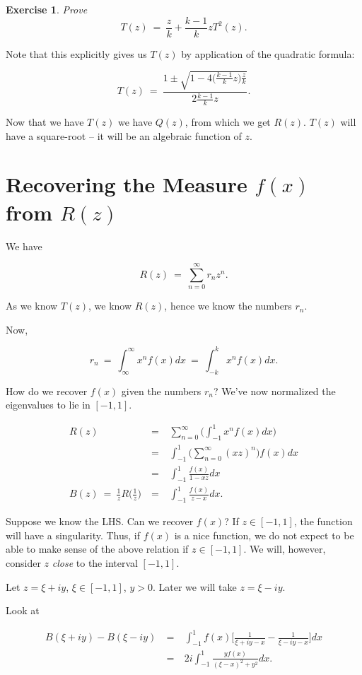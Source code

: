 \documentclass[12pt,letterpaper]{report}
\newcommand\be{\begin{equation}}
\newcommand\ee{\end{equation}}
\newcommand\bea{\begin{eqnarray}}
\newcommand\eea{\end{eqnarray}}
\newtheorem{exe}[thm]{Exercise}
\begin{document}
\begin{exe} Prove
\be T(z) \ = \ \frac{z}{k} + \frac{k-1}{k}z T^2(z). \ee
\end{exe}

Note that this explicitly gives us $T(z)$ by application of the
quadratic formula:

\be T(z) \ = \ \frac{1 \pm \sqrt{1 -  4 \Big( \frac{k-1}{k}z
\Big) \frac{z}{k} } }{2\frac{k-1}{k}z}. \ee

Now that we have $T(z)$ we have $Q(z)$, from which we get $R(z)$.
$T(z)$ will have a square-root -- it will be an algebraic function
of $z$.


\section{Recovering the Measure $f(x)$ from $R(z)$}

We have

\be R(z) \ = \ \sum_{n=0}^\infty r_n z^n. \ee

As we know $T(z)$, we know $R(z)$, hence we know the numbers
$r_n$.

Now,

\be r_n \ = \ \int_{\infty}^\infty x^n f(x)dx \ = \ \int_{-k}^k
x^n f(x)dx. \ee

How do we recover $f(x)$ given the numbers $r_n$? We've now
normalized the eigenvalues to lie in $[-1,1]$.

\bea R(z) & \ = \ & \sum_{n=0}^\infty \Bigg( \int_{-1}^1 x^n
f(x)dx \Bigg) \nonumber\\ & \ = \ & \int_{-1}^1 \Bigg(
\sum_{n=0}^\infty (xz)^n \Bigg) f(x) dx \nonumber\\ & \ = \ &
\int_{-1}^1 \frac{ f(x) }{1 - xz } dx \nonumber\\ B(z) \ = \
\frac{1}{z} R\Big(\frac{1}{z}\Big) & \ = \ & \int_{-1}^1 \frac{
f(x) }{z - x}dx. \eea

Suppose we know the LHS. Can we recover $f(x)$? If $z \in [-1,1]$,
the function will have a singularity. Thus, if $f(x)$ is a nice
function, we do not expect to be able to make sense of the above
relation if $z \in [-1,1]$. We will, however, consider $z$
\emph{close} to the interval $[-1,1]$.

Let $z = \xi + iy$, $\xi \in [-1,1]$, $y > 0$. Later we will take
$z = \xi - iy$.

Look at

\bea B(\xi + iy) - B(\xi - iy) & \ = \ & \int_{-1}^1 f(x) \Bigg[
\frac{1}{\xi + iy - x} - \frac{1}{\xi - iy - x} \Bigg]dx
\nonumber\\ & \ = \ & 2i \int_{-1}^1 \frac{ yf(x) }{ (\xi - x)^2 +
y^2 }dx. \eea
\end{document}
